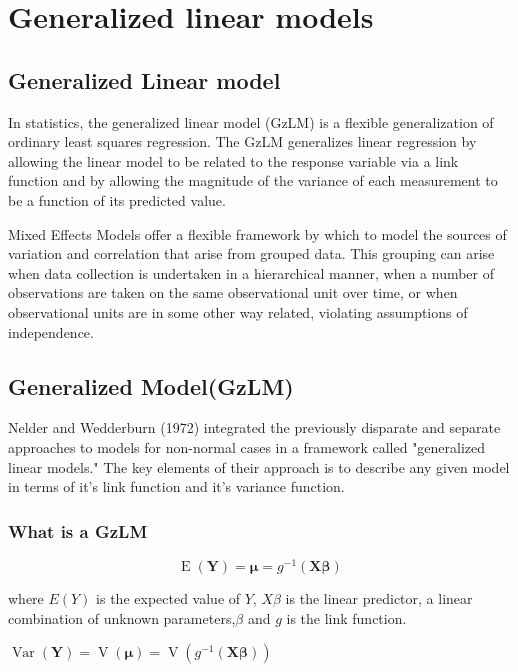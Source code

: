 \documentclass[12pt, a4paper]{report}
\theoremstyle{plain}
\theoremstyle{definition}
\theoremstyle{remark}
\begin{document}
	
	
	
	\chapter{Generalized linear models}
	\section{Generalized Linear model}
	In statistics, the generalized linear model (GzLM) is a flexible
	generalization of ordinary least squares regression. The GzLM
	generalizes linear regression by allowing the linear model to be
	related to the response variable via a link function and by
	allowing the magnitude of the variance of each measurement to be a
	function of its predicted value.
	
	
	Mixed Effects Models offer a flexible framework by which to model
	the sources of variation and correlation that arise from grouped
	data. This grouping can arise when data collection is undertaken
	in a hierarchical manner, when a number of observations are taken
	on the same observational unit over time, or when observational
	units are in some other way related, violating assumptions of
	independence.
	
	\section{Generalized  Model(GzLM)}
	
	Nelder and Wedderburn (1972) integrated the previously disparate
	and separate approaches to models for non-normal cases in a
	framework called "generalized linear models."  The key elements of
	their approach is to describe any given model in terms of it's
	link function and it's variance function.
	
	\subsection{What is a GzLM}
	
	\begin{equation}
	\operatorname{E}(\mathbf{Y}) = \boldsymbol{\mu} =
	g^{-1}(\mathbf{X}\boldsymbol{\beta})
	\end{equation}
	
	where $E(Y)$ is the expected value of $Y$, $X\beta$ is the linear
	predictor, a linear combination of unknown parameters,$\beta$ and
	$g$ is the link function.
	
	
	$\operatorname{Var}(\mathbf{Y}) = \operatorname{V}(
	\boldsymbol{\mu} ) =
	\operatorname{V}(g^{-1}(\mathbf{X}\boldsymbol{\beta}))$
	\\
	
\end{document}

